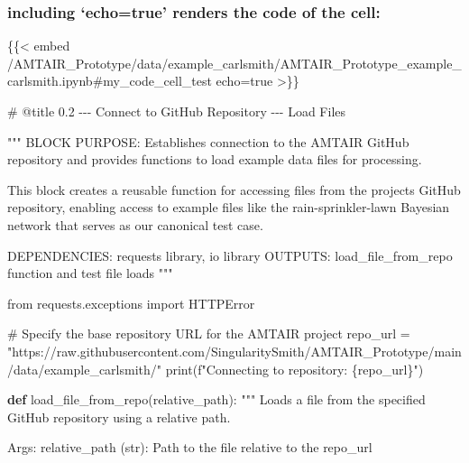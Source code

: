 \documentclass[
  11pt,
  letterpaper,
]{book}
\newenvironment{Shaded}{\begin{snugshade}}{\end{snugshade}}
\newcommand{\BuiltInTok}[1]{\textcolor[rgb]{0.00,0.23,0.31}{#1}}
\newcommand{\CommentTok}[1]{\textcolor[rgb]{0.37,0.37,0.37}{#1}}
\newcommand{\ImportTok}[1]{\textcolor[rgb]{0.00,0.46,0.62}{#1}}
\newcommand{\KeywordTok}[1]{\textcolor[rgb]{0.00,0.23,0.31}{\textbf{#1}}}
\newcommand{\NormalTok}[1]{\textcolor[rgb]{0.00,0.23,0.31}{#1}}
\newcommand{\OperatorTok}[1]{\textcolor[rgb]{0.37,0.37,0.37}{#1}}
\newcommand{\SpecialCharTok}[1]{\textcolor[rgb]{0.37,0.37,0.37}{#1}}
\newcommand{\SpecialStringTok}[1]{\textcolor[rgb]{0.13,0.47,0.30}{#1}}
\newcommand{\StringTok}[1]{\textcolor[rgb]{0.13,0.47,0.30}{#1}}
\begin{document}
\subsubsection{including `echo=true' renders the code of the
cell:}\label{including-echotrue-renders-the-code-of-the-cell-1}

\begin{Shaded}
\begin{Highlighting}[]
\NormalTok{\{\{\textless{} embed /AMTAIR\_Prototype/data/example\_carlsmith/AMTAIR\_Prototype\_example\_carlsmith.ipynb\#my\_code\_cell\_test echo=true \textgreater{}\}\}}
\end{Highlighting}
\end{Shaded}

\label{my_code_cell_test}
\begin{Shaded}
\begin{Highlighting}[]
\CommentTok{\# @title 0.2 {-}{-}{-} Connect to GitHub Repository {-}{-}{-} Load Files}

\CommentTok{"""}
\CommentTok{BLOCK PURPOSE: Establishes connection to the AMTAIR GitHub repository and provides}
\CommentTok{functions to load example data files for processing.}

\CommentTok{This block creates a reusable function for accessing files from the project\textquotesingle{}s}
\CommentTok{GitHub repository, enabling access to example files like the rain{-}sprinkler{-}lawn}
\CommentTok{Bayesian network that serves as our canonical test case.}

\CommentTok{DEPENDENCIES: requests library, io library}
\CommentTok{OUTPUTS: load\_file\_from\_repo function and test file loads}
\CommentTok{"""}

\ImportTok{from}\NormalTok{ requests.exceptions }\ImportTok{import}\NormalTok{ HTTPError}

\CommentTok{\# Specify the base repository URL for the AMTAIR project}
\NormalTok{repo\_url }\OperatorTok{=} \StringTok{"https://raw.githubusercontent.com/SingularitySmith/AMTAIR\_Prototype/main/data/example\_carlsmith/"}
\BuiltInTok{print}\NormalTok{(}\SpecialStringTok{f"Connecting to repository: }\SpecialCharTok{\{}\NormalTok{repo\_url}\SpecialCharTok{\}}\SpecialStringTok{"}\NormalTok{)}

\KeywordTok{def}\NormalTok{ load\_file\_from\_repo(relative\_path):}
    \CommentTok{"""}
\CommentTok{    Loads a file from the specified GitHub repository using a relative path.}

\CommentTok{    Args:}
\CommentTok{        relative\_path (str): Path to the file relative to the repo\_url}


\end{Highlighting}
\end{Shaded}
\end{document}
